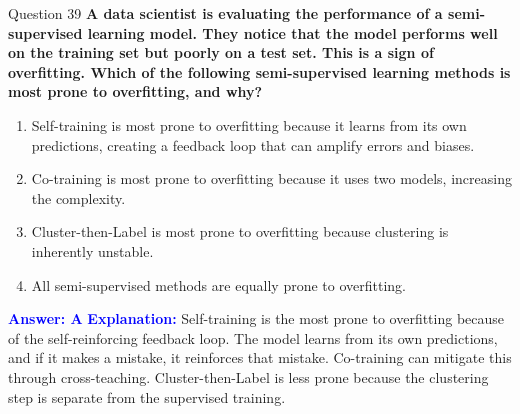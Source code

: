 \documentclass{beamer}
\begin{document}
	\begin{frame}{Question 39}
		\textbf{A data scientist is evaluating the performance of a semi-supervised learning model. They notice that the model performs well on the training set but poorly on a test set. This is a sign of overfitting. Which of the following semi-supervised learning methods is most prone to overfitting, and why?}
		\begin{enumerate}
			\item Self-training is most prone to overfitting because it learns from its own predictions, creating a feedback loop that can amplify errors and biases.
			\item Co-training is most prone to overfitting because it uses two models, increasing the complexity.
			\item Cluster-then-Label is most prone to overfitting because clustering is inherently unstable.
			\item All semi-supervised methods are equally prone to overfitting.
		\end{enumerate}
		\vspace{0.2cm}
		\textcolor{blue}{\textbf{Answer: A}}
		\vspace{0.2cm}
		\textcolor{blue}{\textbf{Explanation:}} Self-training is the most prone to overfitting because of the self-reinforcing feedback loop. The model learns from its own predictions, and if it makes a mistake, it reinforces that mistake. Co-training can mitigate this through cross-teaching. Cluster-then-Label is less prone because the clustering step is separate from the supervised training.
	\end{frame}
	
\end{document}
